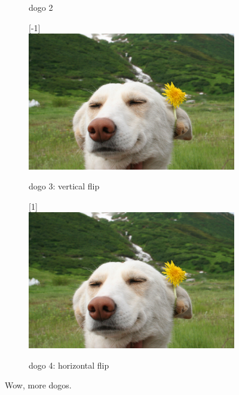 \documentclass[12pt, a4paper, oneside]{article}
\begin{document}
\begin{figure}[h]
\begin{subfigure}[b]{0.4\textwidth}
        \caption{dogo 2} \vspace{5mm}
    \end{subfigure}
    \begin{subfigure}[b]{0.4\textwidth}
        \scalebox{1}[-1]{\includegraphics[trim={0.9cm 0cm 0.9cm 0.73cm}, clip, width=\textwidth]{dog}}
        \caption{dogo 3: vertical flip}
    \end{subfigure}
    \hspace{6mm}
    \begin{subfigure}[b]{0.4\textwidth}
        \scalebox{-1}[1]{\includegraphics[trim={0.9cm 0cm 0.9cm 0.73cm}, clip, width=\textwidth]{dog}}
        \caption{dogo 4: horizontal flip}
    \end{subfigure}
    \caption[More dogs]{Wow, more dogos.}
    \label{fig:dogos}
\end{figure}
\end{document}
